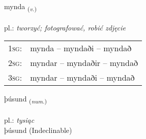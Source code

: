 \documentclass[frontgrid, backgrid]{flacards}\usepackage[]{graphicx}\usepackage[]{xcolor}
\begin{document}
\renewcommand{\flhead}{\vskip5pt \fboxsep=0pt {\small\bfseries\footnotesize Sagnorð | Verb}}
\renewcommand{\fcfoot}{\vskip5pt \fboxsep=0pt \hspace{2pt}{\small\bfseries\footnotesize 1K}}

\renewcommand{\blhead}{\vskip5pt {\small\bfseries\footnotesize Sagnorð | Verb }}
\renewcommand{\bcfoot}{\vskip5pt \hspace{2pt}{\small\bfseries\footnotesize 1K}}


{mynda \small{\textsubscript{(\textit{v.})}} \\[1ex] %
\textphonetic{[mɪnta]} \\
pl.: \emph{tworzyć; fotografować, robić zdjęcie} \\  [2ex]
\renewcommand*{\arraystretch}{0.8}
\begin{tabular}{p{1cm}l}
\textsc{1sg}: & mynda -- myndaði -- myndað \\ 
\textsc{2sg}: & myndar -- myndaðir -- myndað \\ 
\textsc{3sg}: & myndar -- myndaði -- myndað \\ 
\end{tabular}
}


\renewcommand{\flhead}{\vskip5pt \fboxsep=0pt {\small\bfseries\footnotesize Töluorð | Numeral}}
\renewcommand{\fcfoot}{\vskip5pt \fboxsep=0pt \hspace{2pt}{\small\bfseries\footnotesize 1K}}

\renewcommand{\blhead}{\vskip5pt {\small\bfseries\footnotesize Töluorð | Numeral }}
\renewcommand{\bcfoot}{\vskip5pt \hspace{2pt}{\small\bfseries\footnotesize 1K}}


{þúsund \small{\textsubscript{(\textit{num.})}} \\[1ex]
\textphonetic{[θuːsʏnt]} \\
pl.: \emph{tysiąc} \\  [2ex]
þúsund (Indeclinable)}

\renewcommand{\flhead}{\vskip5pt \fboxsep=0pt {\small\bfseries\footnotesize Nafnorð | Noun}}
\renewcommand{\fcfoot}{\vskip5pt \fboxsep=0pt \hspace{2pt}{\small\bfseries\footnotesize 1K}}
\end{document}
